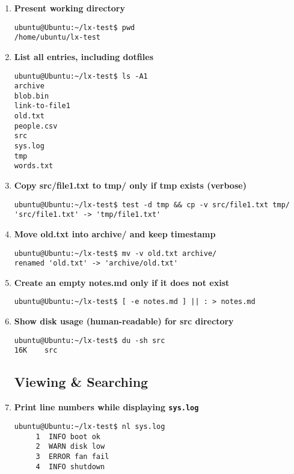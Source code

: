\begin{enumerate}[leftmargin=2em]

  \item \textbf{Present working directory}
\begin{Verbatim}[formatcom=\color{blue}]
ubuntu@Ubuntu:~/lx-test$ pwd
/home/ubuntu/lx-test
\end{Verbatim}

  \item \textbf{List all entries, including dotfiles}
\begin{Verbatim}[formatcom=\color{blue}]
ubuntu@Ubuntu:~/lx-test$ ls -A1
archive
blob.bin
link-to-file1
old.txt
people.csv
src
sys.log
tmp
words.txt
\end{Verbatim}

  \item \textbf{Copy src/file1.txt to tmp/ only if tmp exists (verbose)}
\begin{Verbatim}[formatcom=\color{blue}]
ubuntu@Ubuntu:~/lx-test$ test -d tmp && cp -v src/file1.txt tmp/
'src/file1.txt' -> 'tmp/file1.txt'
\end{Verbatim}

  \item \textbf{Move old.txt into archive/ and keep timestamp}
\begin{Verbatim}[formatcom=\color{blue}]
ubuntu@Ubuntu:~/lx-test$ mv -v old.txt archive/
renamed 'old.txt' -> 'archive/old.txt'
\end{Verbatim}

  \item \textbf{Create an empty notes.md only if it does not exist}
\begin{Verbatim}[formatcom=\color{blue}]
ubuntu@Ubuntu:~/lx-test$ [ -e notes.md ] || : > notes.md
\end{Verbatim}

  \item \textbf{Show disk usage (human-readable) for src directory}
\begin{Verbatim}[formatcom=\color{blue}]
ubuntu@Ubuntu:~/lx-test$ du -sh src
16K    src
\end{Verbatim}


\subsection{Viewing \& Searching}

    \item \textbf{Print line numbers while displaying \texttt{sys.log}}
\begin{Verbatim}[formatcom=\color{blue}]
ubuntu@Ubuntu:~/lx-test$ nl sys.log
     1  INFO boot ok
     2  WARN disk low
     3  ERROR fan fail
     4  INFO shutdown
\end{Verbatim}


\end{enumerate}
